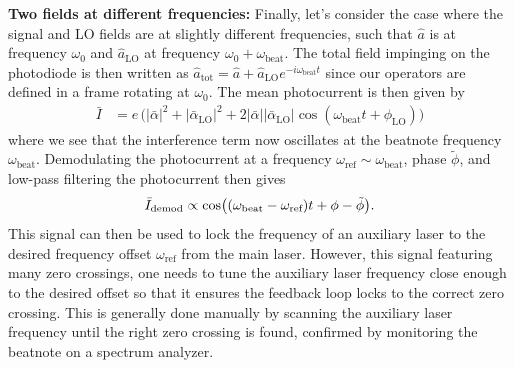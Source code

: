 \noindent \textbf{Two fields at different frequencies: } Finally, let's consider the case where the signal and LO fields are at slightly different frequencies, such that $\hat a$ is at frequency $\omega_0$ and $\hat a_{\mathrm{LO}}$ at frequency $\omega_0 +  \omega_{\text{beat}}$. The total field impinging on the photodiode is then written as $\hat a_{\mathrm{tot}} = \hat a + \hat a_{\mathrm{LO}} e^{-i \omega_{\text{beat}} t}$ since our operators are defined in a frame rotating at $\omega_0$. The mean photocurrent is then given by
\begin{equation}
  \begin{split}
    \bar I &= e \, \bigg(|\bar \alpha|^2 + |\bar \alpha_{\mathrm{LO}}|^2 + 2 |\bar \alpha| |\bar \alpha_{\mathrm{LO}}| \cos (\omega_{\text{beat}} t + \phi_{\mathrm{LO}}) \bigg)
  \end{split}
\end{equation}
where we see that the interference term now oscillates at the beatnote frequency $\omega_{\text{beat}}$. Demodulating the photocurrent at a frequency $\omega_{\text{ref}} \sim\omega_{\text{beat}}$, phase $\tilde \phi$, and low-pass filtering the photocurrent then gives 
\begin{equation}
\bar I_{\rm demod} \propto   \cos ((\omega_{\text{beat}} - \omega_{\text{ref}})t + \phi - \tilde \phi).
\end{equation}
This signal can then be used to lock the frequency of an auxiliary laser to the desired frequency offset $\omega_{\text{ref}}$ from the main laser. However, this signal featuring many zero crossings, one needs to tune the auxiliary laser frequency close enough to the desired offset so that it ensures the feedback loop locks to the correct zero crossing. This is generally done manually by scanning the auxiliary laser frequency until the right zero crossing is found, confirmed by monitoring the beatnote on a spectrum analyzer. 

